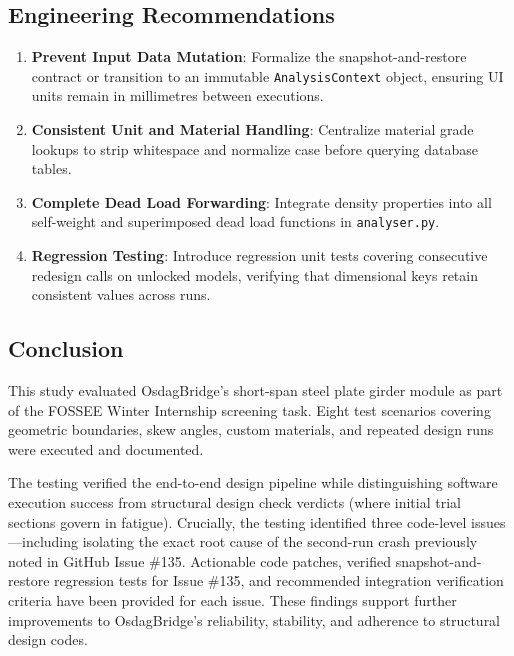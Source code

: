 \documentclass[11pt,a4paper]{article}
\begin{document}
\subsection{Engineering Recommendations}
\begin{enumerate}
    \item \textbf{Prevent Input Data Mutation}: Formalize the snapshot-and-restore contract or transition to an immutable \texttt{AnalysisContext} object, ensuring UI units remain in millimetres between executions.
    \item \textbf{Consistent Unit and Material Handling}: Centralize material grade lookups to strip whitespace and normalize case before querying database tables.
    \item \textbf{Complete Dead Load Forwarding}: Integrate density properties into all self-weight and superimposed dead load functions in \texttt{analyser.py}.
    \item \textbf{Regression Testing}: Introduce regression unit tests covering consecutive redesign calls on unlocked models, verifying that dimensional keys retain consistent values across runs.
\end{enumerate}

\subsection{Conclusion}
This study evaluated OsdagBridge's short-span steel plate girder module as part of the FOSSEE Winter Internship screening task. Eight test scenarios covering geometric boundaries, skew angles, custom materials, and repeated design runs were executed and documented. 

The testing verified the end-to-end design pipeline while distinguishing software execution success from structural design check verdicts (where initial trial sections govern in fatigue). Crucially, the testing identified three code-level issues—including isolating the exact root cause of the second-run crash previously noted in GitHub Issue \#135. Actionable code patches, verified snapshot-and-restore regression tests for Issue \#135, and recommended integration verification criteria have been provided for each issue. These findings support further improvements to OsdagBridge's reliability, stability, and adherence to structural design codes.
\end{document}
